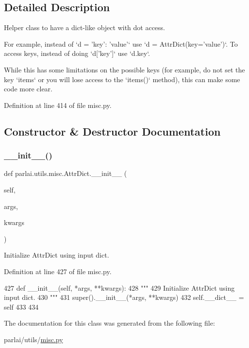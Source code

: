 \subsection{Detailed Description}
\begin{DoxyVerb}Helper class to have a dict-like object with dot access.

For example, instead of `d = {'key': 'value'}` use
`d = AttrDict(key='value')`.
To access keys, instead of doing `d['key']` use `d.key`.

While this has some limitations on the possible keys (for example, do not
set the key `items` or you will lose access to the `items()` method), this
can make some code more clear.
\end{DoxyVerb}
 

Definition at line 414 of file misc.\+py.



\subsection{Constructor \& Destructor Documentation}
\mbox{\label{classparlai_1_1utils_1_1misc_1_1AttrDict_a8a0ed33202adee184fc7ec06cf89a7ba}} 
\subsubsection{\texorpdfstring{\+\_\+\+\_\+init\+\_\+\+\_\+()}{\_\_init\_\_()}}
{\footnotesize\ttfamily def parlai.\+utils.\+misc.\+Attr\+Dict.\+\_\+\+\_\+init\+\_\+\+\_\+ (\begin{DoxyParamCaption}\item[{}]{self,  }\item[{}]{args,  }\item[{}]{kwargs }\end{DoxyParamCaption})}

\begin{DoxyVerb}Initialize AttrDict using input dict.
\end{DoxyVerb}
 

Definition at line 427 of file misc.\+py.


\begin{DoxyCode}
427     \textcolor{keyword}{def }\_\_init\_\_(self, *args, **kwargs):
428         \textcolor{stringliteral}{"""}
429 \textcolor{stringliteral}{        Initialize AttrDict using input dict.}
430 \textcolor{stringliteral}{        """}
431         super().\_\_init\_\_(*args, **kwargs)
432         self.\_\_dict\_\_ = self
433 
434 
\end{DoxyCode}


The documentation for this class was generated from the following file\+:\begin{DoxyCompactItemize}
\item 
parlai/utils/\hyperlink{misc_8py}{misc.\+py}\end{DoxyCompactItemize}
